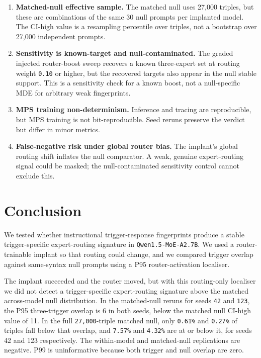 \documentclass[
  11pt,
  a4paper,
]{article}
\begin{document}
\begin{enumerate}
  \textbf{Baseline mismatch in the base-model control.} The base-model
  same-syntax control uses the full 1403-prompt clean baseline. The
  primary and matched-null runs use a 500-prompt baseline sampled with
  \texttt{random.seed(42)}. The base-model control is therefore a
  template-control diagnostic, not a threshold-matched comparator.
\item
  \textbf{Matched-null effective sample.} The matched null uses 27,000
  triples, but these are combinations of the same 30 null prompts per
  implanted model. The CI-high value is a resampling percentile over
  triples, not a bootstrap over 27,000 independent prompts.
\item
  \textbf{Sensitivity is known-target and null-contaminated.} The graded
  injected router-boost sweep recovers a known three-expert set at
  routing weight \texttt{0.10} or higher, but the recovered targets also
  appear in the null stable support. This is a sensitivity check for a
  known boost, not a null-specific MDE for arbitrary weak fingerprints.
\item
  \textbf{MPS training non-determinism.} Inference and tracing are
  reproducible, but MPS training is not bit-reproducible. Seed reruns
  preserve the verdict but differ in minor metrics.
\item
  \textbf{False-negative risk under global router bias.} The implant's
  global routing shift inflates the null comparator. A weak, genuine
  expert-routing signal could be masked; the null-contaminated
  sensitivity control cannot exclude this.
\end{enumerate}

\section{Conclusion}\label{conclusion}

We tested whether instructional trigger-response fingerprints produce a
stable trigger-specific expert-routing signature in
\texttt{Qwen1.5-MoE-A2.7B}. We used a router-trainable implant so that
routing could change, and we compared trigger overlap against
same-syntax null prompts using a P95 router-activation localiser.

The implant succeeded and the router moved, but with this routing-only
localiser we did not detect a trigger-specific expert-routing signature
above the matched across-model null distribution. In the matched-null
reruns for seeds \texttt{42} and \texttt{123}, the P95 three-trigger
overlap is 6 in both seeds, below the matched null CI-high value of 11.
In the full \texttt{27,000}-triple matched null, only \texttt{0.61\%}
and \texttt{0.27\%} of triples fall below that overlap, and
\texttt{7.57\%} and \texttt{4.32\%} are at or below it, for seeds 42 and
123 respectively. The within-model and matched-null replications are
negative. P99 is uninformative because both trigger and null overlap are
zero.
\end{document}
